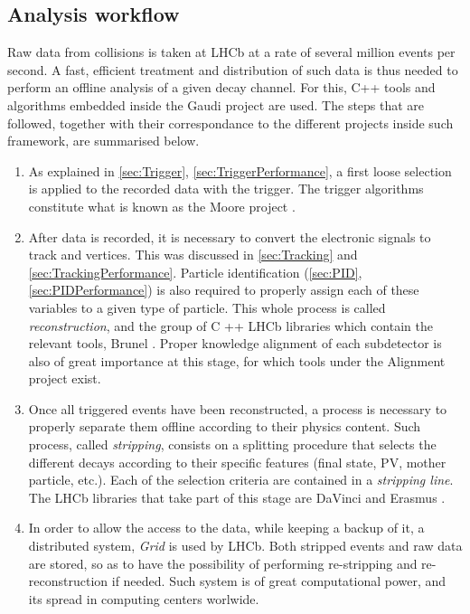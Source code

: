 
\subsection{Analysis workflow}
Raw data from collisions is taken at LHCb at a rate of several million events per second. A fast, efficient treatment and distribution of such data is thus needed to perform an offline analysis of a given decay channel. For this, C++ tools and algorithms embedded inside the Gaudi  project are used. The steps that are followed, together with their correspondance to the different projects inside such framework, are summarised below. 

\begin{enumerate}
\item As explained in \ref{sec:Trigger}, \ref{sec:TriggerPerformance}, a first loose selection is applied to the recorded data with the trigger. The trigger algorithms constitute what is known as the Moore project . 
\item After data is recorded, it is necessary to convert the electronic signals to track and vertices. This was discussed in \ref{sec:Tracking} and \ref{sec:TrackingPerformance}. Particle identification (\ref{sec:PID}, \ref{sec:PIDPerformance}) is also required to properly assign each of these variables to a given type of particle. This whole process is called \textit{reconstruction}, and the group of C ++ LHCb libraries which contain the relevant tools, Brunel . Proper knowledge alignment of each subdetector is also of great importance at this stage, for which tools under the Alignment project  exist.  %
\item Once all triggered events have been reconstructed, a process is necessary to properly separate them offline according to their physics content. Such process, called \textit{stripping}, consists on a splitting procedure that selects the different decays according to their specific features (final state, PV, mother particle, etc.). Each of the selection criteria are contained in a \textit{stripping line}. The LHCb libraries that take part of this stage are DaVinci  and Erasmus .
\item In order to allow the access to the data, while keeping a backup of it, a distributed system, \textit{Grid}  is used by LHCb. Both stripped events and raw data are stored, so as to have the possibility of performing re-stripping and re-reconstruction if needed. Such system is of great computational power, and its spread in computing centers worlwide. 

\end{enumerate}
